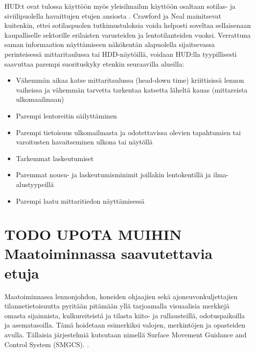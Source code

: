 \documentclass[utf8,bachelor,manualbib]{gradu3}
\begin{document}
HUD:t ovat tulossa käyttöön myös yleisilmailun käyttöön osaltaan sotilas- ja siviilipuolella havaittujen etujen ansiosta \citep{ververswickens1998}. Crawford ja Neal \citeyearpar{crawfordneal2006} mainitsevat kuitenkin, ettei sotilaspuolen tutkimustuloksia voida helposti soveltaa sellaisenaan kaupalliselle sektorille erilaisten varusteiden ja lentotilanteiden vuoksi. Verrattuna saman informaation näyttämiseen näkökentän alapuolella sijaitsevassa perinteisessä mittaritaulussa tai HDD-näytöillä, voidaan HUD:lla tyypillisesti saavuttaa parempi suorituskyky etenkin seuraavilla alueilla:

\begin{itemize}
\item Vähemmän aikaa katse mittaritaulussa (head-down time) kriittisissä lennon vaiheissa ja vähemmän tarvetta tarkentaa katsetta läheltä kauas (mittareista ulkomaailmaan) \citep{maywickens1995}
\item Parempi lentoreitin säilyttäminen \citep{fischerym1980, lauberym1982, wickenslong1995}
\item Parempi tietoisuus ulkomailmasta ja odotettavissa olevien tapahtumien tai varoitusten havaitseminen ulkona tai näytöllä \citep{faddenym2000, fischer1979, larishwickens1991, maywickens1995, wickenslong1995}
\item Tarkemmat laskeutumiset \citep{naish1964}
\item Paremmat nousu- ja laskeutumisminimit joillakin lentokentillä ja ilma-alustyypeillä \citep{crawfordneal2006}
\item Parempi laatu mittaritiedon näyttämisessä \citep{maywickens1995}
\end{itemize}

\section{TODO UPOTA MUIHIN Maatoiminnassa saavutettavia etuja}

Maatoiminnassa lennonjohdon, koneiden ohjaajien sekä ajoneuvonkuljettajien tilannetietoisuutta pyritään pitämään yllä tarjoamalla visuaalisia merkkejä omasta sijainnista, kulkureiteistä ja tilasta kiito- ja rullausteillä, odotuspaikoilla ja asematasoilla. Tämä hoidetaan esimerkiksi valojen, merkintöjen ja opasteiden avulla. Tällaisia järjestelmiä kutsutaan nimellä Surface Movement Guidance and Control System (SMGCS). \citep{prinzel2013}.
\end{document}

